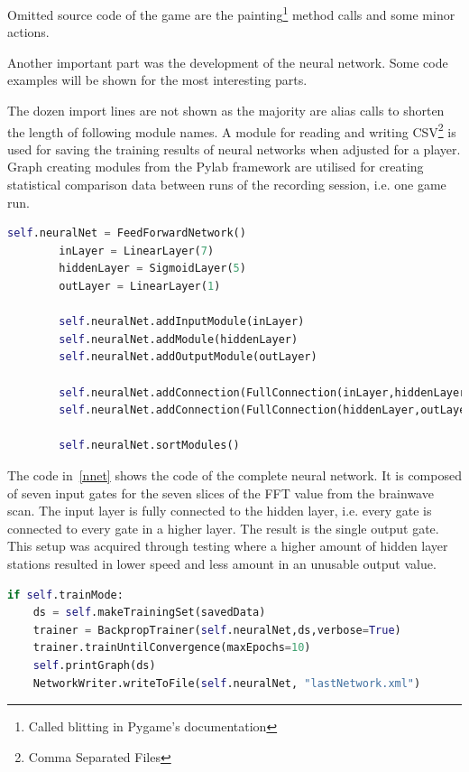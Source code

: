 \documentclass[bibtotocnumbered, headsepline,normalheadings,12pt]{report}
\begin{document}
Omitted source code of the game are the painting\footnote{Called blitting in Pygame's documentation} method calls and some minor 
actions. 

Another important part was the development of the neural network. Some code examples will be shown for the most interesting parts.

The dozen import lines are not shown as the majority are alias calls to shorten the length of following module names. A module for
reading and writing CSV\footnote{Comma Separated Files} is used for saving the training results of neural networks when adjusted for 
a player. Graph creating modules from the Pylab framework are utilised for creating statistical comparison data between 
runs of the recording session, i.e. one game run.

\begin{lstlisting}[float,language=Python,caption=Design of the Neural Network, label=nnet]
self.neuralNet = FeedForwardNetwork()
        inLayer = LinearLayer(7)
        hiddenLayer = SigmoidLayer(5)
        outLayer = LinearLayer(1)

        self.neuralNet.addInputModule(inLayer)
        self.neuralNet.addModule(hiddenLayer)
        self.neuralNet.addOutputModule(outLayer)

        self.neuralNet.addConnection(FullConnection(inLayer,hiddenLayer))
        self.neuralNet.addConnection(FullConnection(hiddenLayer,outLayer))

        self.neuralNet.sortModules()
\end{lstlisting}

The code in~\ref{nnet} shows the code of the complete neural network. It is composed of seven input gates for the seven slices of the FFT 
value from the brainwave scan. The input layer is fully connected to the hidden layer, i.e. every gate is connected to every gate in 
a higher layer. The result is the single output gate. This setup was acquired through testing where a higher amount of hidden layer 
stations resulted in lower speed and less amount in an unusable output value.  

\begin{lstlisting}[float,language=Python,caption=Training of the Neural Network, label=ntrain]
if self.trainMode:
    ds = self.makeTrainingSet(savedData)
    trainer = BackpropTrainer(self.neuralNet,ds,verbose=True)
    trainer.trainUntilConvergence(maxEpochs=10)
    self.printGraph(ds)
    NetworkWriter.writeToFile(self.neuralNet, "lastNetwork.xml")
\end{lstlisting}
\end{document}
